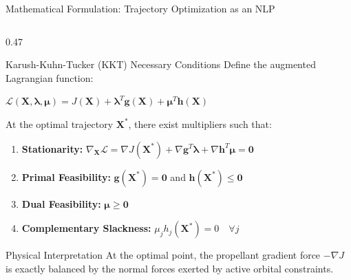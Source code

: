 \documentclass[aspectratio=169, 10pt]{beamer}
\begin{document}
\begin{frame}{Mathematical Formulation: Trajectory Optimization as an NLP}
\begin{columns}[t]
        \begin{column}{0.47\textwidth}
            \begin{alertblock}{Karush-Kuhn-Tucker (KKT) Necessary Conditions}
                \scriptsize
                Define the augmented Lagrangian function:
                \par\vspace{1pt}
                {\centering $\displaystyle \mathcal{L}(\mathbf{X}, \boldsymbol{\lambda}, \boldsymbol{\mu}) = J(\mathbf{X}) + \boldsymbol{\lambda}^T \mathbf{g}(\mathbf{X}) + \boldsymbol{\mu}^T \mathbf{h}(\mathbf{X})$\par}
                \vspace{2pt}
                At the optimal trajectory $\mathbf{X}^*$, there exist multipliers such that:
                \begin{enumerate}\setlength{\itemsep}{1.5pt}
                    \item \textbf{Stationarity:} $\nabla_{\mathbf{X}} \mathcal{L} = \nabla J(\mathbf{X}^*) + \nabla \mathbf{g}^T \boldsymbol{\lambda} + \nabla \mathbf{h}^T \boldsymbol{\mu} = \mathbf{0}$
                    \item \textbf{Primal Feasibility:} $\mathbf{g}(\mathbf{X}^*) = \mathbf{0}$ and $\mathbf{h}(\mathbf{X}^*) \le \mathbf{0}$
                    \item \textbf{Dual Feasibility:} $\boldsymbol{\mu} \ge \mathbf{0}$
                    \item \textbf{Complementary Slackness:} $\mu_j h_j(\mathbf{X}^*) = 0 \quad \forall j$
                \end{enumerate}
            \end{alertblock}

            \vspace{-0.08cm}

            \begin{exampleblock}{Physical Interpretation}
                \scriptsize
                At the optimal point, the propellant gradient force $-\nabla J$ is exactly balanced by the normal forces exerted by active orbital constraints.
            \end{exampleblock}
        \end{column}
    \end{columns}
\end{frame}
\end{document}
